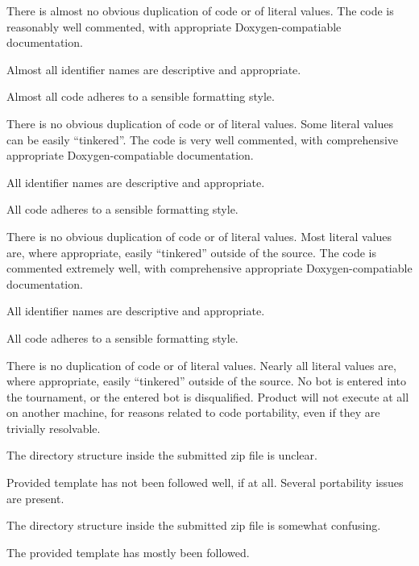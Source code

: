 \documentclass{../../fal_assignment}
\begin{document}
\begin{markingrubric}
             \par There is almost no obvious duplication of code or of literal values.   
        \grade The code is reasonably well commented, with appropriate Doxygen-compatiable documentation.
            \par Almost all identifier names are descriptive and appropriate.
            \par Almost all code adheres to a sensible formatting style.
             \par There is no obvious duplication of code or of literal values. Some literal values can be easily ``tinkered''. 
        \grade The code is very well commented, with comprehensive appropriate Doxygen-compatiable documentation.
            \par All identifier names are descriptive and appropriate.
            \par All code adheres to a sensible formatting style.
             \par There is no obvious duplication of code or of literal values. Most literal values are, where appropriate, easily ``tinkered'' outside of the source.  
        \grade The code is commented extremely well, with comprehensive appropriate Doxygen-compatiable documentation.
            \par All identifier names are descriptive and appropriate.
            \par All code adheres to a sensible formatting style.
            \par There is no duplication of code or of literal values. Nearly all literal values are, where appropriate, easily ``tinkered'' outside of the source.  
%
        \grade\fail No bot is entered into the tournament, or the entered bot is disqualified.
%
        \grade\fail Product will not execute at all on another machine, for reasons related to code portability, even if they are trivially resolvable.
            \par The directory structure inside the submitted zip file is unclear.
            \par Provided template has not been followed well, if at all.
        \grade Several portability issues are present.
            \par The directory structure inside the submitted zip file is somewhat confusing.
            \par The provided template has mostly been followed.

\end{markingrubric}
\end{document}
